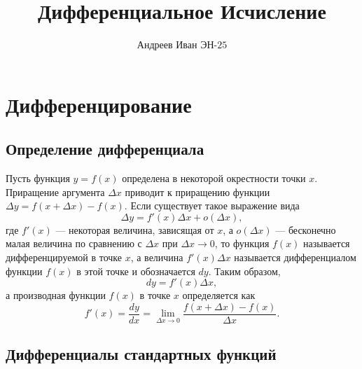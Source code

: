 \documentclass[12pt]{article}
\title{\titlelolita Дифференциальное Исчисление}
\author{Андреев Иван ЭН-$25$}
\date{}
\begin{document}
\maketitle

\pagebreak

\section{\hywenhei Дифференцирование}

\subsection{\hywenhei Определение дифференциала}

Пусть функция $y = f(x)$ определена в некоторой 
окрестности точки $x$. Приращение аргумента $\Delta x$ 
приводит к приращению функции 
$\Delta y = f(x + \Delta x) - f(x)$. 
Если существует такое выражение вида
\[
\Delta y = f'(x)\Delta x + o(\Delta x),
\]
где $f'(x)$ — некоторая величина, зависящая от $x$, а 
$o(\Delta x)$ — бесконечно малая величина по сравнению с 
$\Delta x$ при $\Delta x \to 0$, то функция $f(x)$ 
называется дифференцируемой в точке $x$, а величина 
$f'(x)\Delta x$ называется дифференциалом функции $f(x)$ 
в этой точке и обозначается $dy$. Таким образом,
\[dy = f'(x)\Delta x,\]
а производная функции $f(x)$ в точке $x$ определяется как
\[f'(x) = \frac{dy}{dx} = \lim_{\Delta x \to 0}\frac{f(x + \Delta x) - f(x)}{\Delta x}.\]

\subsection{\hywenhei Дифференциалы стандартных функций}
\end{document}
